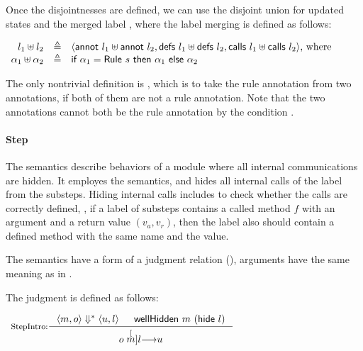 Once the disjointnesses are defined, we can use the disjoint union for
updated states  and the merged label ,
where the label merging is defined as follows:

\begin{definition}
  \label{def-lplus}
  \mbox{}
  \begin{center}
    \begin{math}
      \begin{array}{rcl}
        l_1 \uplus l_2 & \triangleq &
        \langle \textsf{annot}\ l_1 \uplus \textsf{annot}\ l_2, \textsf{defs}\ l_1 \uplus \textsf{defs}\ l_2, \textsf{calls}\ l_1 \uplus \textsf{calls}\ l_2 \rangle \textrm{, where} \\
        \alpha_1 \uplus \alpha_2 & \triangleq &
        \textsf{if}\ \alpha_1 = \textsf{Rule}\ s\ \textsf{then}\ \alpha_1\
        \textsf{else}\ \alpha_2 \\
      \end{array}
    \end{math}
  \end{center}
\end{definition}

The only nontrivial definition is , which
is to take the rule annotation from two annotations, \alphameth{} if
both of them are not a rule annotation. Note that the two annotations
cannot both be the rule annotation by the condition
.

\paragraph{Step}
The \Step{} semantics describe behaviors of a module where all
internal communications are hidden. It employes the \Substep{}
semantics, and hides all internal calls of the label from the
substeps. Hiding internal calls includes to check whether the calls
are correctly defined, \ie{}, if a label of substeps contains a called
method $f$ with an argument and a return value $(v_a, v_r)$, then the
label also should contain a defined method with the same name and the
value.

The \Step{} semantics have a form of a judgment relation
(), arguments have the same meaning as in
\Substeps{}.

\begin{definition}
  \label{def-semstep}
  The judgment  is defined as follows:
  \begin{center}
    \begin{math}
      \begin{array}{c}
        \inference[StepIntro:]{\semsss{m}{o}{u}{l} & \wellhidden{m}{(\hide{l})}}
                  {\semstep{m}{o}{u}{l}} \\
        \mbox{} \\
      \end{array}
    \end{math}
  \end{center}
\end{definition}

